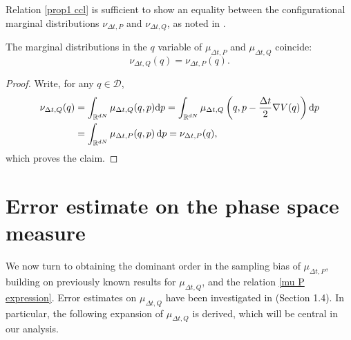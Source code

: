 Relation \eqref{prop1 ccl} is sufficient to show an equality between the configurational marginal distributions $\nu_{\Delta t,P}$ and $\nu_{\Delta t,Q}$, as noted in \cite{KK22}.
\begin{corollary}\label{corr marginal equality}
  The marginal distributions in the $q$ variable of $\mu_{\Delta t,P}$ and $\mu_{\Delta t,Q}$ coincide:
  \begin{equation}
    \label{marginal distributions equality}
    \nu_{\Delta t,Q}(q)= \nu_{\Delta t,P}(q).
  \end{equation}
\end{corollary}
\begin{proof}
  Write, for any $q\in \mathcal D$,
  \begin{equation*}
    \label{corrolary 1 proof}
    \begin{aligned}
    \nu_{\Delta t,Q}(q) &= \int_{\mathbb{R}^{dN}}\mu_{\Delta t,Q}(q,p)\mathrm{d}p=\int_{\mathbb{R}^{dN}}\mu_{\Delta t,Q}\left(q,p-\frac{\Delta t}2 \nabla V(q)\right)\mathrm{d}p\\
    &=\int_{\mathbb{R}^{dN}}\mu_{\Delta t,P}(q,p)\,\mathrm{d}p= \nu_{\Delta t,P}(q),
    \end{aligned}
  \end{equation*}
  which proves the claim.
\end{proof}


\section{Error estimate on the phase space measure}\label{BAOA first order estimate}

We now turn to obtaining the dominant order in the sampling bias of $\mu_{\Delta t,P}$, building on previously known results for $\mu_{\Delta t,Q}$, and the relation \eqref{mu P expression}.
Error estimates on $\mu_{\Delta t,Q}$ have been investigated in \cite{LMS13} (Section 1.4). In particular, the following expansion of $\mu_{\Delta t,Q}$ is derived, which will be central in our analysis.

